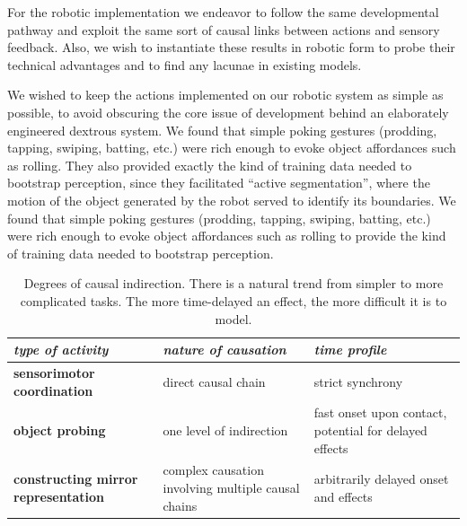 For the robotic implementation we endeavor to follow the same developmental
pathway and exploit the same sort of causal links between actions and 
sensory feedback. Also, we wish to instantiate these results in robotic form to
probe their technical advantages and to find any lacunae in
existing models.

\fi

%
%
%
We wished to keep the actions implemented on our robotic system as
simple as possible, to avoid obscuring the core issue of development
behind an elaborately engineered dextrous system.
%
%
%
%
%
\ifrev
We found that simple poking gestures
(prodding, tapping, swiping, batting, etc.) were rich enough 
to evoke object affordances such as rolling.
They also provided exactly
the kind of training data needed to bootstrap perception,
since they facilitated ``active segmentation'', where the 
motion of the object generated by the robot
served to identify its boundaries.
\else
We found that simple poking gestures
(prodding, tapping, swiping, batting, etc.) were rich enough 
to evoke object affordances such as rolling to provide
the kind of training data needed to bootstrap perception.
\fi

\ifrev
\else
\begin{table}[htbp]
\begin{center}
\begin{tabular}{|p{5.2cm}|p{4.5cm}|p{4.5cm}|}
\hline
{\it type of activity} & {\it nature of causation} &  {\it time profile} \\ \hline\hline
{\bf sensorimotor coordination} & direct causal chain & strict synchrony \\ \hline
{\bf object probing} & one level of indirection & fast onset upon contact, potential for delayed effects\\ \hline
{\bf constructing mirror representation} &  complex causation involving multiple causal chains & arbitrarily delayed onset and effects\\ \hline
\end{tabular}
\caption{
%
Degrees of causal indirection. There is a natural
trend from simpler to more complicated tasks.  The more time-delayed
an effect, the more difficult it is to model.
%
}
\label{tab:causation}
\end{center}
\end{table}
\fi



